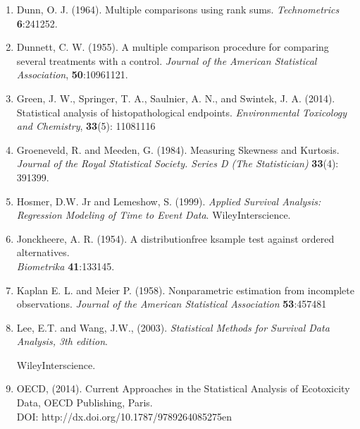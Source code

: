 \documentclass[a4paper]{article}
\begin{document}
\begin{enumerate}
 \item   \hypertarget{R1}{Dunn, O. J. (1964). Multiple comparisons using rank sums. \textit{Technometrics} \textbf{6}:241\textemdash{}252.}
	
 \item	 \hypertarget{R2}{Dunnett, C. W. (1955). A multiple comparison procedure for comparing several treatments with a control. 
		\textit{Journal of the American Statistical Association}, \textbf{50}:1096\textendash{}1121.}


 \item	 \hypertarget{R3}{Green, J. W., Springer, T. A., Saulnier, A. N., and Swintek, J. A. (2014). Statistical analysis of histopathological endpoints. 
		  \textit{Environmental Toxicology and Chemistry}, \textbf{33}(5): 1108\textemdash{}1116}

\item	 \hypertarget{R4}{Groeneveld, R. and Meeden, G. (1984). Measuring Skewness and Kurtosis. 
		\textit{Journal of the Royal Statistical Society. Series D (The Statistician)} \textbf{33}(4): 391\textemdash{}399.} 

 \item	 \hypertarget{R5}{Hosmer, D.W. Jr and Lemeshow, S. (1999). \textit{Applied Survival Analysis: Regression Modeling of Time to Event Data}. Wiley\textemdash{}Interscience. }		
	
 \item	 \hypertarget{R6}{Jonckheere, A. R. (1954). A distribution\textendash{}free k\textendash{}sample test against ordered alternatives.\\ \textit{Biometrika} \textbf{41}:133\textemdash{}145. }

 \item	 \hypertarget{R7}{Kaplan E. L. and Meier P. (1958). Non\textendash{}parametric estimation from incomplete observations. 
	\textit{Journal of the American Statistical Association } \textbf{53}:457\textemdash{}481}

 
 \item  \hypertarget{R8}{Lee, E.T. and Wang, J.W., (2003). \textit{Statistical Methods for Survival Data Analysis, 3th edition}.} 
	Wiley\textemdash{}Interscience. 

 \item  \hypertarget{R9}{OECD, (2014). Current Approaches in the Statistical Analysis of Ecotoxicity Data, OECD	
	Publishing, Paris. \\
	DOI: http://dx.doi.org/10.1787/9789264085275\textemdash{}en }
 

\end{enumerate}
\end{document}
